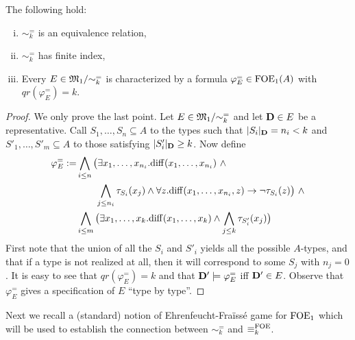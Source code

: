 \begin{proposition}\label{props:eqrelofoe} The following hold:
	\begin{enumerate}[(i)]
		 pt
		\item $\sim^=_k$ is an equivalence relation,
		\item $\sim^=_k$ has finite index,
		\item Every $E \in \mathfrak{M}_1/{\sim^=_k}$ is characterized by a formula $\varphi^=_E \in \mathrm{FOE}_1(A)$ with $qr(\varphi^=_E) = k$.
	\end{enumerate}
\end{proposition}
\begin{proof}
	We only prove the last point. Let $E \in \mathfrak{M}_1/{\sim^=_k}$ and let $\mathbf{D} \in E$ be a representative. Call $S_1,\dots,S_n \subseteq A$ to the types such that $|S_i|_{\mathbf{D}} = n_i < k$ and $S'_1,\dots,S'_m \subseteq A$ to those satisfying $|S'_i|_{\mathbf{D}} \geq k$. Now define
	\begin{align*}
	\varphi^=_E := & \bigwedge_{i\leq n} \big(\exists x_1,\dots,x_{n_i}.\mathrm{diff}(x_1,\dots,x_{n_i}) \ \land \\
		& \qquad\bigwedge_{j\leq n_i} \tau_{S_i}(x_j) \land \forall z. \mathrm{diff}(x_1,\dots,x_{n_i},z) \to \lnot\tau_{S_i}(z)\big)\ \land \\
	    & \bigwedge_{i\leq m} \big(\exists x_1,\dots,x_k.\mathrm{diff}(x_1,\dots,x_k) \land \bigwedge_{j\leq k} \tau_{S'_i}(x_j) \big)
	\end{align*}
	First note that the union of all the $S_i$ and $S'_i$ yields all the possible $A$-types, and that if a type is not realized at all, then it will correspond to some $S_j$ with $n_j = 0$. It is easy to see that $qr(\varphi^=_E) = k$ and that $\mathbf{D}' \models \varphi^=_E$ iff $\mathbf{D}' \in E$. Observe that $\varphi^=_E$ gives a specification of $E$ ``type by type''.
\end{proof}

Next we recall a (standard) notion of Ehrenfeucht-Fra\"iss\'e game for $\mathrm{FOE}_1$ which will be used to establish the connection between ${\sim^=_k}$ and $\equiv_k^\mathrm{FOE}$.

